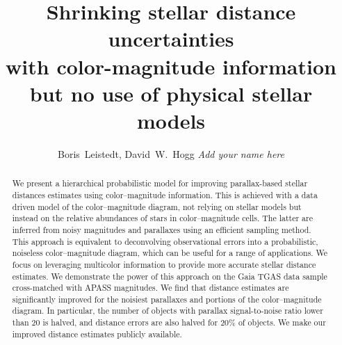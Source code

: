 \documentclass[manuscript, letterpaper]{aastex6}
\begin{document}
 
\title{Shrinking stellar distance uncertainties\\
 with color-magnitude information \\
  but no use of physical stellar models}
  


\author{
	Boris~Leistedt,
	David~W.~Hogg
	\textit{Add your name here}
	}


  
  
\begin{abstract}
We present a hierarchical probabilistic model for improving parallax-based stellar distances estimates using color--magnitude information. 
This is achieved with a data driven model of the color--magnitude diagram, not relying on stellar models but instead on the  relative abundances of stars in color--magnitude cells.
The latter are inferred from noisy magnitudes and parallaxes using an efficient sampling method.
This approach is equivalent to deconvolving observational errors into a probabilistic, noiseless color--magnitude diagram, which can be useful for a range of applications. 
We focus on leveraging multicolor information to provide more accurate stellar distance estimates.
We demonstrate the power of this approach on the Gaia TGAS data sample cross-matched with APASS magnitudes.
We find that distance estimates are significantly improved for the noisiest parallaxes and portions of the color--magnitude diagram. 
In particular, the number of objects with parallax signal-to-noise ratio lower than 20 is halved, and distance errors are also halved for 20\% of objects.
We make our improved distance estimates publicly available.
\end{abstract}

\end{document}
